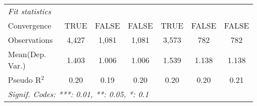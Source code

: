 \begin{tabular}{lcccccc}
   \midrule
   \emph{Fit statistics}\\
   Convergence             &TRUE           & FALSE  & FALSE  & TRUE          & FALSE  & FALSE\\  
   Observations            & 4,427         & 1,081  & 1,081  & 3,573         & 782    & 782\\  
Mean(Dep. Var.) & 1.403 & 1.006 & 1.006 & 1.539 & 1.138 & 1.138 \\
   Pseudo R$^2$            & 0.20          & 0.19   & 0.20   & 0.20          & 0.20   & 0.21\\  
   \midrule \midrule
   \multicolumn{7}{l}{\emph{Signif. Codes: ***: 0.01, **: 0.05, *: 0.1}}\\
\end{tabular}
\par\endgroup
